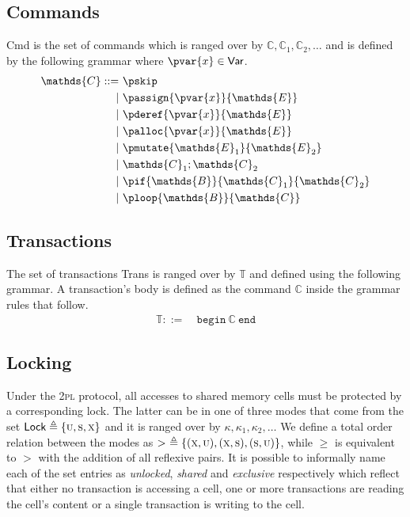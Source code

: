 \subsection{Commands}

\textsf{Cmd} is the set of commands which is ranged over by $\mathds{C}, \mathds{C}_1, \mathds{C}_2, \ldots$ and is defined by the following grammar where $\pvar{x} \in \mathsf{Var}$.
\begin{align*}
\mathds{C} ::=&
\ \pskip \\
|&\ \passign{\pvar{x}}{\mathds{E}} \\
|&\ \pderef{\pvar{x}}{\mathds{E}} \\
|&\ \palloc{\pvar{x}}{\mathds{E}} \\
|&\ \pmutate{\mathds{E}_1}{\mathds{E}_2} \\
|&\ \mathds{C}_1; \mathds{C}_2 \\
|&\ \pif{\mathds{B}}{\mathds{C}_1}{\mathds{C}_2} \\
|&\ \ploop{\mathds{B}}{\mathds{C}}
\end{align*}

\subsection{Transactions}

The set of transactions \textsf{Trans} is ranged over by $\mathds{T}$ and defined using the following grammar. A transaction's body is defined as the command $\mathds{C}$ inside the grammar rules that follow.
\begin{align*}
\mathds{T} ::=&
\ \mathtt{begin}\ \mathds{C}\ \mathtt{end}
\end{align*}

\subsection{Locking}

Under the \textsc{2pl} protocol, all accesses to shared memory cells must be protected by a corresponding lock. The latter can be in one of three modes that come from the set $\mathsf{Lock} \triangleq \{ \textsc{u}, \textsc{s}, \textsc{x} \}$ and it is ranged over by $\kappa, \kappa_1, \kappa_2, \ldots$ We define a total order relation between the modes as $>\ \triangleq \{ (\textsc{x}, \textsc{u}), (\textsc{x}, \textsc{s}), (\textsc{s}, \textsc{u}) \}$, while $\geq$ is equivalent to $>$ with the addition of all reflexive pairs. It is possible to informally name each of the set entries as \textit{unlocked}, \textit{shared} and \textit{exclusive} respectively which reflect that either no transaction is accessing a cell, one or more transactions are reading the cell's content or a single transaction is writing to the cell.

